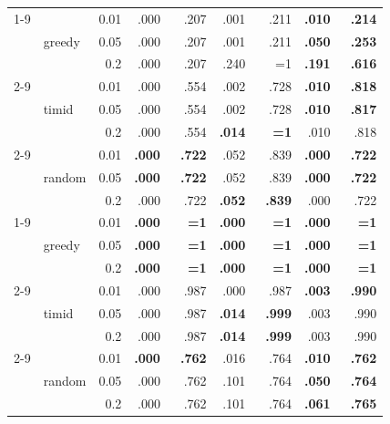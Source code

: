 \documentclass{article}
\begin{document}
\begin{table}[h]
\begin{tabular}{l@{\hskip 12pt} l@{\hskip 12pt} r@{\hskip 12pt} rr@{\hskip 12pt} rr@{\hskip 12pt} rr@{\hskip 12pt}}
 \cmidrule(lr){1-9}
\multirow{9}{*}{drone} & \multirow{3}{*}{greedy} & 0.01 & .000 & .207 & .001 & .211 & \textbf{.010} & \textbf{.214} \\
 &  & 0.05 & .000 & .207 & .001 & .211 & \textbf{.050} & \textbf{.253} \\
 &  & 0.2 & .000 & .207 & \cellcolor{red!20}.240 & \cellcolor{red!20}~~{=}1 & \textbf{.191} & \textbf{.616} \\
 \cmidrule(lr){2-9}
 & \multirow{3}{*}{timid} & 0.01 & .000 & .554 & .002 & .728 & \textbf{.010} & \textbf{.818} \\
 &  & 0.05 & .000 & .554 & .002 & .728 & \textbf{.010} & \textbf{.817} \\
 &  & 0.2 & .000 & .554 & \textbf{.014} & \textbf{~~{=}1} & .010 & .818 \\
 \cmidrule(lr){2-9}
 & \multirow{3}{*}{random} & 0.01 & \textbf{.000} & \textbf{.722} & \cellcolor{red!20}.052 & \cellcolor{red!20}.839 & \textbf{.000} & \textbf{.722} \\
 &  & 0.05 & \textbf{.000} & \textbf{.722} & \cellcolor{red!20}.052 & \cellcolor{red!20}.839 & \textbf{.000} & \textbf{.722} \\
 &  & 0.2 & .000 & .722 & \textbf{.052} & \textbf{.839} & .000 & .722 \\
 \cmidrule(lr){1-9}
\multirow{9}{*}{drone-b} & \multirow{3}{*}{greedy} & 0.01 & \textbf{.000} & \textbf{~~{=}1} & \textbf{.000} & \textbf{~~{=}1} & \textbf{.000} & \textbf{~~{=}1} \\
 &  & 0.05 & \textbf{.000} & \textbf{~~{=}1} & \textbf{.000} & \textbf{~~{=}1} & \textbf{.000} & \textbf{~~{=}1} \\
 &  & 0.2 & \textbf{.000} & \textbf{~~{=}1} & \textbf{.000} & \textbf{~~{=}1} & \textbf{.000} & \textbf{~~{=}1} \\
 \cmidrule(lr){2-9}
 & \multirow{3}{*}{timid} & 0.01 & .000 & .987 & .000 & .987 & \textbf{.003} & \textbf{.990} \\
 &  & 0.05 & .000 & .987 & \textbf{.014} & \textbf{.999} & .003 & .990 \\
 &  & 0.2 & .000 & .987 & \textbf{.014} & \textbf{.999} & .003 & .990 \\
 \cmidrule(lr){2-9}
 & \multirow{3}{*}{random} & 0.01 & \textbf{.000} & \textbf{.762} & \cellcolor{red!20}.016 & \cellcolor{red!20}.764 & \textbf{.010} & \textbf{.762} \\
 &  & 0.05 & .000 & .762 & \cellcolor{red!20}.101 & \cellcolor{red!20}.764 & \textbf{.050} & \textbf{.764} \\
 &  & 0.2 & .000 & .762 & .101 & .764 & \textbf{.061} & \textbf{.765} \\

\bottomrule
\end{tabular}

\end{table}
\end{document}

